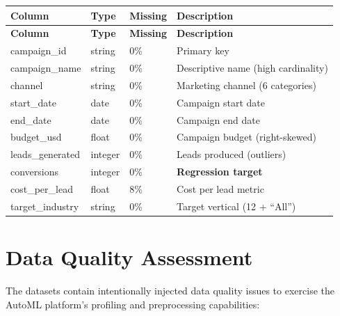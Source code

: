 \documentclass[11pt,a4paper]{article}
\begin{document}
\begin{center}
\begin{longtable}{lllp{5.5cm}}
    \toprule
    \textbf{Column} & \textbf{Type} & \textbf{Missing} & \textbf{Description} \\
    \midrule
    \endfirsthead
    \toprule
    \textbf{Column} & \textbf{Type} & \textbf{Missing} & \textbf{Description} \\
    \midrule
    \endhead
    campaign\_id      & string  & 0\%  & Primary key \\
    campaign\_name    & string  & 0\%  & Descriptive name (high cardinality) \\
    channel           & string  & 0\%  & Marketing channel (6 categories) \\
    start\_date       & date    & 0\%  & Campaign start date \\
    end\_date         & date    & 0\%  & Campaign end date \\
    budget\_usd       & float   & 0\%  & Campaign budget (right-skewed) \\
    leads\_generated  & integer & 0\%  & Leads produced (outliers) \\
    conversions       & integer & 0\%  & \textbf{Regression target} \\
    cost\_per\_lead   & float   & 8\%  & Cost per lead metric \\
    target\_industry  & string  & 0\%  & Target vertical (12 + ``All'') \\
    \bottomrule
\end{longtable}
\end{center}

\section{Data Quality Assessment}

The datasets contain intentionally injected data quality issues to exercise the
AutoML platform's profiling and preprocessing capabilities:
\end{document}
